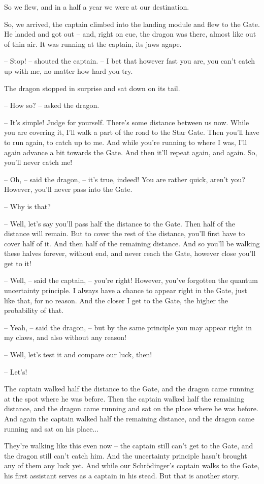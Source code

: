 \documentclass[ebook,oneside,final,openright]{memoir}
\begin{document}
So we flew, and in a half a year we were at our destination.\par
\par
So, we arrived, the captain climbed into the landing module and flew to the Gate. He landed and got out – and, right on cue, the dragon was there, almost like out of thin air. It was running at the captain, its jaws agape.\par
– Stop! – shouted the captain. – I bet that however fast you are, you can’t catch up with me, no matter how hard you try.\par
The dragon stopped in surprise and sat down on its tail.\par
– How so? – asked the dragon.\par
– It’s simple! Judge for yourself. There’s some distance between us now. While you are covering it, I’ll walk a part of the road to the Star Gate. Then you’ll have to run again, to catch up to me. And while you’re running to where I was, I’ll again advance a bit towards the Gate. And then it’ll repeat again, and again. So, you’ll never catch me!\par
– Oh, – said the dragon, – it’s true, indeed! You are rather quick, aren’t you? However, you’ll never pass into the Gate.\par
– Why is that?\par
– Well, let’s say you’ll pass half the distance to the Gate. Then half of the distance will remain. But to cover the rest of the distance, you’ll first have to cover half of it. And then half of the remaining distance. And so you’ll be walking these halves forever, without end, and never reach the Gate, however close you’ll get to it!\par
– Well, – said the captain, – you’re right! However, you’ve forgotten the quantum uncertainty principle. I always have a chance to appear right in the Gate, just like that, for no reason. And the closer I get to the Gate, the higher the probability of that.\par
– Yeah, – said the dragon, – but by the same principle you may appear right in my claws, and also without any reason!\par
– Well, let’s test it and compare our luck, then!\par
– Let’s!\par
\par
The captain walked half the distance to the Gate, and the dragon came running at the spot where he was before. Then the captain walked half the remaining distance, and the dragon came running and sat on the place where he was before. And again the captain walked half the remaining distance, and the dragon came running and sat on his place...\par
\par
They’re walking like this even now – the captain still can’t get to the Gate, and the dragon still can’t catch him. And the uncertainty principle hasn’t brought any of them any luck yet. And while our Schrödinger’s captain walks to the Gate, his first assistant serves as a captain in his stead. But that is another story.
\end{document}
